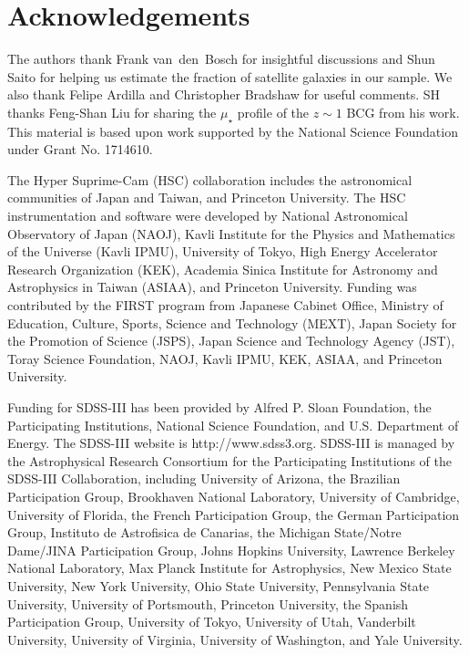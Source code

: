 \documentclass[a4paper,fleqn,usenatbib]{mnras}
\def\mden{{$\mu_{\star}$}}
\begin{document}
\section*{Acknowledgements}

  The authors thank Frank van~den~Bosch for insightful discussions and Shun Saito for 
  helping us estimate the fraction of satellite galaxies in our sample.
  We also thank Felipe Ardilla and Christopher Bradshaw for useful comments. 
  SH thanks Feng-Shan Liu for sharing the \mden{} profile of the $z\sim1$ BCG from 
  his work. 
  This material is based upon work supported by the National Science Foundation under 
  Grant No. 1714610.

  The Hyper Suprime-Cam (HSC) collaboration includes the astronomical communities of 
  Japan and Taiwan, and Princeton University.  The HSC instrumentation and software were
  developed by National Astronomical Observatory of Japan (NAOJ), Kavli Institute
  for the Physics and Mathematics of the Universe (Kavli IPMU), University of Tokyo,
  High Energy Accelerator Research Organization (KEK), Academia Sinica Institute
  for Astronomy and Astrophysics in Taiwan (ASIAA), and Princeton University.  
  Funding was contributed by the FIRST program from Japanese Cabinet Office,  Ministry 
  of Education, Culture, Sports, Science and Technology (MEXT), Japan Society for 
  the Promotion of Science (JSPS), Japan Science and Technology Agency (JST), Toray 
  Science Foundation, NAOJ, Kavli IPMU, KEK, ASIAA, and Princeton University.
   
  Funding for SDSS-III has been provided by Alfred P. Sloan Foundation, the 
  Participating Institutions, National Science Foundation, and U.S. Department of
  Energy. The SDSS-III website is http://www.sdss3.org.  SDSS-III is managed by the
  Astrophysical Research Consortium for the Participating Institutions of the SDSS-III
  Collaboration, including University of Arizona, the Brazilian Participation Group,
  Brookhaven National Laboratory, University of Cambridge, University of Florida, the
  French Participation Group, the German Participation Group, Instituto de Astrofisica
  de Canarias, the Michigan State/Notre Dame/JINA Participation Group, Johns Hopkins
  University, Lawrence Berkeley National Laboratory, Max Planck Institute for
  Astrophysics, New Mexico State University, New York University, Ohio State University,
  Pennsylvania State University, University of Portsmouth, Princeton University, the
  Spanish Participation Group, University of Tokyo, University of Utah, Vanderbilt
  University, University of Virginia, University of Washington, and Yale University.
  
\end{document}
